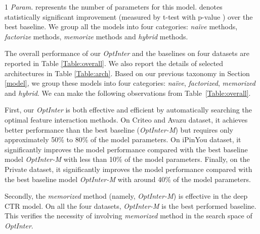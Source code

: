 \documentclass[conference]{IEEEtran}
\begin{document}
\begin{table*}[!htbp]
{\begin{tabular}{c|ccc|ccc|ccc|ccc}
		\hline
	\end{tabular}

	\begin{tablenotes}
    \footnotesize
    \item[1] \textit{Param.} represents the number of parameters for this model.  denotes statistically significant improvement (measured by t-test with p-value ) over the best baseline. We group all the models into four categories: \emph{naïve} methods, \emph{factorize} methods, \emph{memorize} methods and \emph{hybrid} methods.
    \end{tablenotes}
}
\end{table*}


The overall performance of our \textit{OptInter} and the baselines on four datasets are reported in Table \ref{Table:overall}. We also report the details of selected architectures in Table \ref{Table:arch}. Based on our previous taxonomy in Section \ref{model}, we group these models into four categories: \emph{naïve}, \emph{factorized}, \emph{memorized} and \emph{hybrid}. We can make the following observations from Table~\ref{Table:overall}.

First, our \textit{OptInter} is both effective and efficient by automatically searching the optimal feature interaction methods. On Criteo and Avazu dataset, it achieves better performance than the best baseline (\textit{OptInter-M}) but requires only approximately 50\% to 80\% of the model parameters. On iPinYou dataset, it significantly improves the model performance compared with the best baseline model \textit{OptInter-M} with less than 10\% of the model parameters. Finally, on the Private dataset, it significantly improves the model performance compared with the best baseline model \textit{OptInter-M} with around 40\% of the model parameters. 

Secondly, the \emph{memorized} method (namely, \textit{OptInter-M}) is effective in the deep CTR model. On all the four datasets, \textit{OptInter-M} is the best performed baseline.
This verifies the necessity of involving \emph{memorized} method in the search space of \textit{OptInter}.
\end{document}
